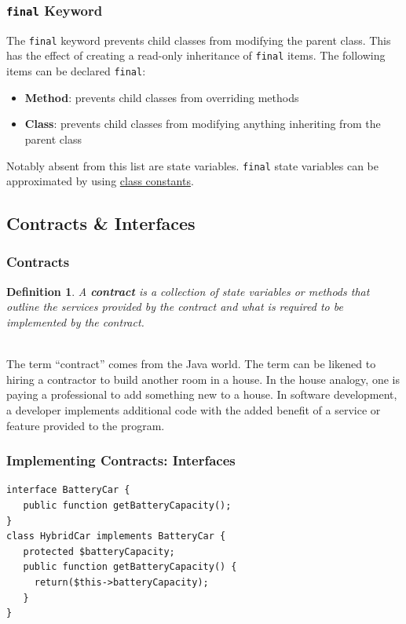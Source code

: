 \documentclass[aspectratio=169]{beamer}
\newtheorem{defn}{Definition}
\begin{document}
\begin{frame}
\frametitle{\texttt{final} Keyword}
The \texttt{final} keyword prevents child classes from modifying the parent class. This has the effect of creating a read-only inheritance of \texttt{final} items. The following items can be declared \texttt{final}:
\begin{itemize}
	\item \textbf{Method}: prevents child classes from overriding methods
	\item \textbf{Class}: prevents child classes from modifying anything inheriting from the parent class
\end{itemize}
Notably absent from this list are state variables. \texttt{final} state variables can be approximated by using \href{http://php.net/manual/en/language.oop5.constants.php}{class constants}. 
\end{frame}

\subsection{Contracts \& Interfaces}
\begin{frame}
\frametitle{Contracts}
\begin{defn}
A \textbf{contract} is a collection of state variables or methods that outline the services provided by the contract and what is required to be implemented by the contract.
\end{defn}

\pause
\mbox{}\\
The term ``contract'' comes from the Java world. \cite{javapractices} The term can be likened to hiring a contractor to build another room in a house. In the house analogy, one is paying a professional to add something new to a house. In software development, a developer implements additional code with the added benefit of a service or feature provided to the program.
\end{frame}

\begin{frame}[fragile]
\frametitle{Implementing Contracts: Interfaces}
\begin{lstlisting}[caption=Creating a Hybrid Car]
interface BatteryCar {
   public function getBatteryCapacity();
}
class HybridCar implements BatteryCar {
   protected $batteryCapacity;
   public function getBatteryCapacity() {
     return($this->batteryCapacity);
   }
}
\end{lstlisting}
\end{frame}
\end{document}
